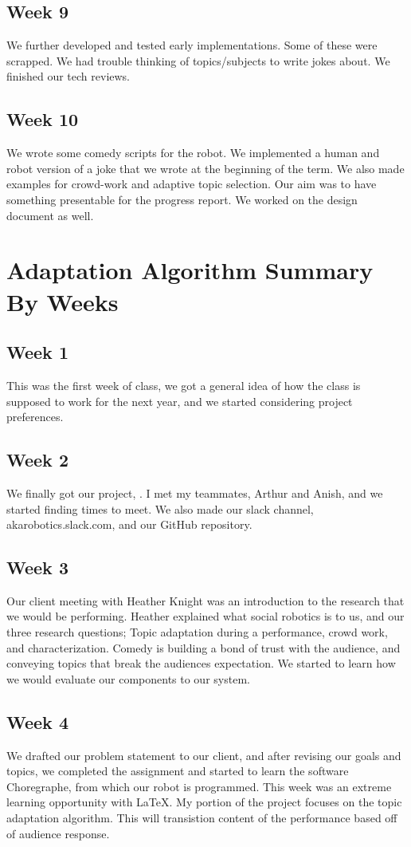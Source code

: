 \documentclass[onecolumn, draftclsnofoot,10pt, compsoc]{IEEEtran}
\begin{document}
\subsection{Week 9}
We further developed and tested early implementations. Some of these were scrapped. We had trouble thinking of topics/subjects to write jokes about. We finished our tech reviews.
\subsection{Week 10}
We wrote some comedy scripts for the robot. We implemented a human and robot version of a joke that we wrote at the beginning of the term. We also made examples for crowd-work and adaptive topic selection. Our aim was to have something presentable for the progress report. We worked on the design document as well.


\section{Adaptation Algorithm Summary By Weeks}

\subsection{Week 1}
	This was the first week of class, we got a general idea of how the class is supposed to work for the next year, and we started considering project preferences.
\subsection{Week 2}
	We finally got our project, . I met my teammates, Arthur and Anish, and we started finding times to meet. We also made our slack channel, akarobotics.slack.com, and our GitHub repository.
\subsection{Week 3}
	Our client meeting with Heather Knight was an introduction to the research that we would be performing. Heather explained what social robotics is to us, and our three research questions; Topic adaptation during a performance, crowd work, and characterization. Comedy is building a bond of trust with the audience, and conveying topics that break the audiences expectation. We started to learn how we would evaluate our components to our system.
\subsection{Week 4}
	We drafted our problem statement to our client, and after revising our goals and topics, we completed the assignment and started to learn the software Choregraphe, from which our robot is programmed. This week was an extreme learning opportunity with LaTeX. My portion of the project focuses on the topic adaptation algorithm. This will transistion content of the performance based off of audience response.
\end{document}
